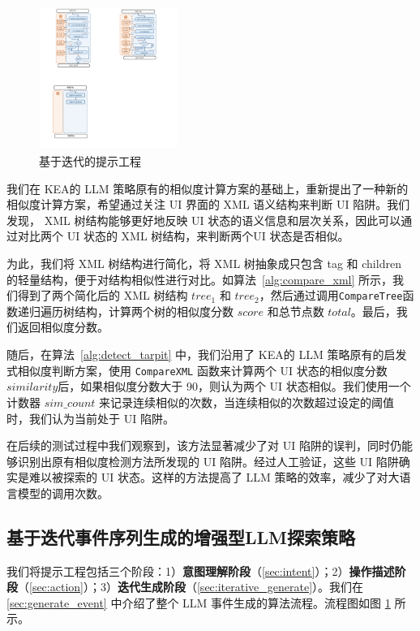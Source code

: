 \documentclass[twocolumn, 10pt]{article}
\newcommand{\kea}{K{\small\MakeUppercase{ea}}}
\begin{document}
\begin{figure}[t]
    \centering
    \includegraphics[width=0.4\textwidth]{pic}
    \caption{基于迭代的提示工程}
    \label{fig:process}
\end{figure}

我们在 \kea 的 LLM 策略原有的相似度计算方案的基础上，重新提出了一种新的相似度计算方案，希望通过关注 UI 界面的 XML 语义结构来判断 UI 陷阱。我们发现， XML 树结构能够更好地反映 UI 状态的语义信息和层次关系，因此可以通过对比两个 UI 状态的 XML 树结构，来判断两个UI 状态是否相似。

为此，我们将 XML 树结构进行简化，将 XML 树抽象成只包含 tag 和 children 的轻量结构，便于对结构相似性进行对比。如算法~\ref{alg:compare_xml} 所示，我们得到了两个简化后的 XML 树结构 $tree_1$ 和 $tree_2$，然后通过调用\texttt{CompareTree}函数递归遍历树结构，计算两个树的相似度分数 $score$ 和总节点数 $total$。最后，我们返回相似度分数。

随后，在算法~\ref{alg:detect_tarpit} 中，我们沿用了 \kea 的 LLM 策略原有的启发式相似度判断方案，使用 \texttt{CompareXML} 函数来计算两个 UI 状态的相似度分数 $similarity$后，如果相似度分数大于 90，则认为两个 UI 状态相似。我们使用一个计数器 $sim\_count$ 来记录连续相似的次数，当连续相似的次数超过设定的阈值时，我们认为当前处于 UI 陷阱。

在后续的测试过程中我们观察到，该方法显著减少了对 UI 陷阱的误判，同时仍能够识别出原有相似度检测方法所发现的 UI 陷阱。经过人工验证，这些 UI 陷阱确实是难以被探索的 UI 状态。这样的方法提高了 LLM 策略的效率，减少了对大语言模型的调用次数。

\subsection{基于迭代事件序列生成的增强型LLM探索策略}
\label{sec:iterative}

我们将提示工程包括三个阶段：1）\textbf{意图理解阶段}（\textsection\ref{sec:intent}）；2）\textbf{操作描述阶段}（\textsection\ref{sec:action}）；3）\textbf{迭代生成阶段}（\textsection\ref{sec:iterative_generate}）。我们在\textsection\ref{sec:generate_event} 中介绍了整个 LLM 事件生成的算法流程。流程图如图 \ref{fig:process} 所示。
\end{document}
